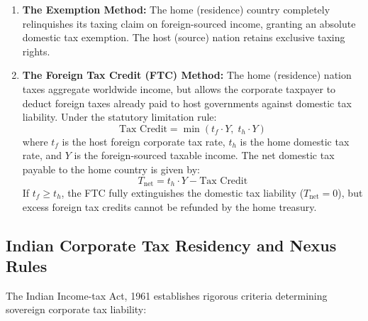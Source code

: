 \begin{enumerate}[leftmargin=1.8em, label=\textbf{(\alph*)}]
    \item \textbf{The Exemption Method:} The home (residence) country completely relinquishes its taxing claim on foreign-sourced income, granting an absolute domestic tax exemption. The host (source) nation retains exclusive taxing rights.
    \item \textbf{The Foreign Tax Credit (FTC) Method:} The home (residence) nation taxes aggregate worldwide income, but allows the corporate taxpayer to deduct foreign taxes already paid to host governments against domestic tax liability. Under the statutory limitation rule:
    \begin{equation}
        \text{Tax Credit} = \min\left( t_f \cdot Y, \; t_h \cdot Y \right)
        \label{eq:ftc_formula}
    \end{equation}
    where $t_f$ is the host foreign corporate tax rate, $t_h$ is the home domestic tax rate, and $Y$ is the foreign-sourced taxable income. The net domestic tax payable to the home country is given by:
    \begin{equation}
        T_{\text{net}} = t_h \cdot Y - \text{Tax Credit}
        \label{eq:net_tax_formula}
    \end{equation}
    If $t_f \ge t_h$, the FTC fully extinguishes the domestic tax liability ($T_{\text{net}} = 0$), but excess foreign tax credits cannot be refunded by the home treasury.
\end{enumerate}

\vspace{0.3em}

\subsection{Indian Corporate Tax Residency and Nexus Rules}
The Indian Income-tax Act, 1961 establishes rigorous criteria determining sovereign corporate tax liability:

